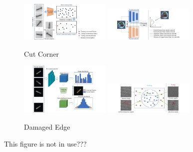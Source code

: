 

\begin{figure}[ht]
    \captionsetup[subfigure]{justification=centering}
    \centering
    \begin{subfigure}[b]{\textwidth}
        \centering
        \includegraphics[width=0.475\textwidth]{figures/approachvizgeneral/memorybankviz.jpg}
        \includegraphics[width=0.475\textwidth]{figures/approachvizgeneral/TSviz.jpg}
        \caption*{Cut Corner}

    \end{subfigure}
    \hfill
    \begin{subfigure}[b]{\textwidth}
        \centering
        \includegraphics[width=0.475\textwidth]{figures/approachvizgeneral/distmapviz.jpg}
        \includegraphics[width=0.475\textwidth]{figures/approachvizgeneral/OCCviz.jpg}
        \caption*{Damaged Edge}

    \end{subfigure}
    

    \caption{This figure is not in use???}
    \label{fig:approachvizgeneral}
\end{figure}